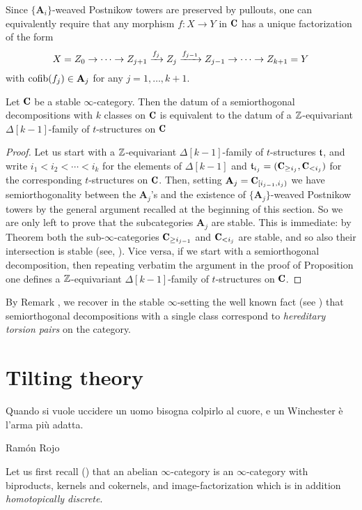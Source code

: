 \documentclass[a4paper,12pt]{amsart}
\renewcommand{\textbf}[1]{\text{\fontseries{b}\selectfont{\upshape #1}}}
\begin{document}
\begin{remark}
Since $\{\mathbf{A}_i\}$-weaved Postnikow towers are preserved by pullouts, one can equivalently require that any morphism $f\colon X\to Y$ in $\C$ has a unique factorization of the form 
\[
X =Z_0\to\cdots \to Z_{j+1} \xrightarrow{f_{j}} Z_{j} \xrightarrow{f_{j-1}}Z_{j-1}\to \cdots\to Z_{k+1}=Y
\]
with $\operatorname{cofib}(f_j)\in \mathbf{A}_j$ for any $j=1,\dots, k+1$. 
\end{remark} 
\begin{theorem}\label{what.s.semiortho}
Let $\C$ be a stable $\infty$-category. Then the datum of a semiorthogonal decompositions with $k$ classes on $\C$ is equivalent to the datum of a $\mathbb{Z} $-equivariant $\Delta[k-1]$-family of $t$-structures on $\C$
\end{theorem}
\begin{proof}
Let us start with a $\mathbb{Z} $-equivariant $\Delta[k-1]$-family of $t$-structures $\mathfrak{t}$, and write $i_1<i_2<\cdots<i_k$ for the elements of $\Delta[k-1]$ and $\tee_{i_j}=(\C_{\geq i_j},\C_{<i_j})$ for the corresponding $t$-structures on $\C$. Then, setting $\mathbf{A}_j=\C_{[i_{j-1}, i_j)}$ we have semiorthogonality between the $\mathbf{A}_j$'s and the existence of $\{\mathbf{A}_j\}$-weaved Postnikow towers by the general argument recalled at the beginning of this section. So we are only left to prove that the subcategories $\mathbf{A}_j$ are stable. This is immediate: by Theorem  both the sub-$\infty$-categories $\C_{\geq i_{j-1}}$ and $\C_{<i_j}$ are stable, and so also their intersection is stable (see, \cite{LurieHA}). Vice versa, if we start with a semiorthogonal decomposition, then repeating verbatim the argument in the proof of Proposition  one defines 
a $\mathbb{Z} $-equivariant $\Delta[k-1]$-family of $t$-structures on $\C$.
\end{proof}
\begin{remark}By Remark , we recover in the stable $\infty$-setting the well known fact (see \cite[\textbf{IV.4}]{Beligiannisreiten}) that semiorthogonal decompositions with a single class correspond to \emph{hereditary torsion pairs} on the category.
\end{remark}
\section{Tilting theory}
\epigraph{Quando si vuole uccidere un uomo bisogna colpirlo al cuore, e un Winchester è l'arma più adatta.}{Ramón Rojo}
Let us first recall (\adef {}) that an abelian $\infty$\hyp{}category is an $\infty$\hyp{}category with biproducts, kernels and cokernels, and image\hyp{}factorization which is in addition \emph{homotopically discrete}.
\end{document}

